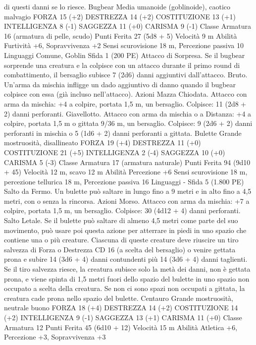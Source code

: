 \begin{multicols}{2}
di questi danni se lo riesce.
Bugbear
Media umanoide (goblinoide), caotico malvagio
FORZA 15 (+2)
DESTREZZA 14 (+2)
COSTITUZIONE 13 (+1)
INTELLIGENZA 8 (-1)
SAGGEZZA 11 (+0)
CARISMA 9 (-1)
Classe Armatura 16 (armatura di pelle, scudo)
Punti Ferita 27 (5d8 + 5)
Velocità 9 m
Abilità Furtività +6, Sopravvivenza +2
Sensi scurovisione 18 m, Percezione passiva 10
Linguaggi Comune, Goblin
Sfida 1 (200 PE)
Attacco di Sorpresa. Se il bugbear sorprende una creatura e la
colpisce con un attacco durante il primo round di combattimento,
il bersaglio subisce 7 (2d6) danni aggiuntivi dall’attacco.
Bruto. Un’arma da mischia infligge un dado aggiuntivo di danno
quando il bugbear colpisce con essa (già incluso nell’attacco).
Azioni
Mazza Chiodata. Attacco con arma da mischia: +4 a colpire,
portata 1,5 m, un bersaglio.
Colpisce: 11 (2d8 + 2) danni perforanti.
Giavellotto. Attacco con arma da mischia o a Distanza: +4 a
colpire, portata 1,5 m o gittata 9/36 m, un bersaglio.
Colpisce: 9 (2d6 + 2) danni perforanti in mischia o 5 (1d6 + 2)
danni perforanti a gittata.
Bulette
Grande mostruosità, disallineato
FORZA 19 (+4)
DESTREZZA 11 (+0)
COSTITUZIONE 21 (+5)
INTELLIGENZA 2 (-4)
SAGGEZZA 10 (+0)
CARISMA 5 (-3)
Classe Armatura 17 (armatura naturale)
Punti Ferita 94 (9d10 + 45)
Velocità 12 m, scavo 12 m
Abilità Percezione +6
Sensi scurovisione 18 m, percezione tellurica 18 m, Percezione
passiva 16
Linguaggi -
Sfida 5 (1.800 PE)
Salto da Fermo. Un bulette può saltare in lungo fino a 9 metri e
in alto fino a 4,5 metri, con o senza la rincorsa.
Azioni
Morso. Attacco con arma da mischia: +7 a colpire, portata 1,5
m, un bersaglio.
Colpisce: 30 (4d12 + 4) danni perforanti.
Salto Letale. Se il bulette può saltare di almeno 4,5 metri come
parte del suo movimento, può usare poi questa azione per
atterrare in piedi in uno spazio che contiene una o più creature.
Ciascuna di queste creature deve riuscire un tiro salvezza di
Forza o Destrezza CD 16 (a scelta del bersaglio) o venire gettata
prona e subire 14 (3d6 + 4) danni contundenti più 14 (3d6 + 4)
danni taglienti. Se il tiro salvezza riesce, la creatura subisce solo
la metà dei danni, non è gettata prona, e viene spinta di 1,5 metri
fuori dello spazio del bulette in uno spazio non occupato a scelta
della creatura. Se non ci sono spazi non occupati a gittata, la
creatura cade prona nello spazio del bulette.
Centauro
Grande mostruosità, neutrale buono
FORZA 18 (+4)
DESTREZZA 14 (+2)
COSTITUZIONE 14 (+2)
INTELLIGENZA 9 (-1)
SAGGEZZA 13 (+1)
CARISMA 11 (+0)
Classe Armatura 12
Punti Ferita 45 (6d10 + 12)
Velocità 15 m
Abilità Atletica +6, Percezione +3, Sopravvivenza +3

\end{multicols}
